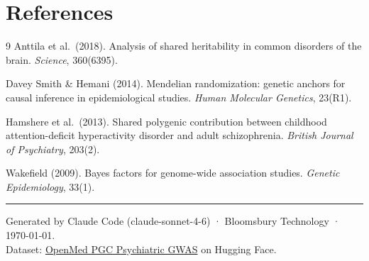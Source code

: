 \documentclass[11pt, a4paper]{article}
\begin{document}
\section*{References}

\begin{thebibliography}{9}
\small
{}
  Anttila et al.\ (2018). Analysis of shared heritability in common disorders of the
  brain. \emph{Science}, 360(6395).

  Davey Smith \& Hemani (2014). Mendelian randomization: genetic anchors for causal
  inference in epidemiological studies. \emph{Human Molecular Genetics}, 23(R1).

  Hamshere et al.\ (2013). Shared polygenic contribution between childhood
  attention-deficit hyperactivity disorder and adult schizophrenia.
  \emph{British Journal of Psychiatry}, 203(2).

  Wakefield (2009). Bayes factors for genome-wide association studies.
  \emph{Genetic Epidemiology}, 33(1).
\end{thebibliography}

\vspace{12pt}\hrule\vspace{6pt}
{\small\color{muted}
Generated by Claude Code (claude-sonnet-4-6) · Bloomsbury Technology · \today.\\
Dataset: \href{https://huggingface.co/collections/OpenMed/pgc-psychiatric-gwas-summary-statistics}%
{OpenMed PGC Psychiatric GWAS} on Hugging Face.
}
\end{document}
